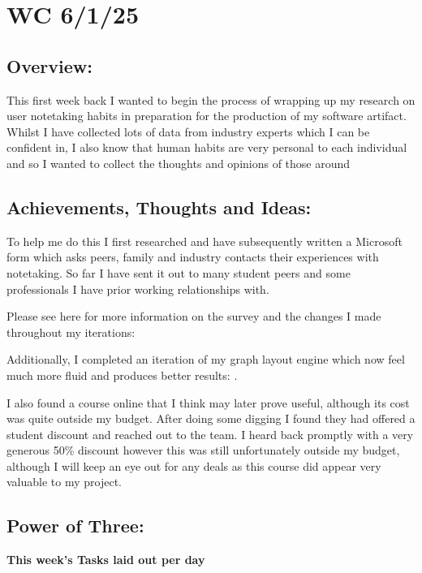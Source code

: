 \section{WC 6/1/25}

\subsection*{Overview:}
This first week back I wanted to begin the process of wrapping up my research on user notetaking habits in preparation for the production of my software artifact. Whilst I have collected lots of data from industry experts which I can be confident in, I also know that human habits are very personal to each individual and so I wanted to collect the thoughts and opinions of those around

\subsection*{Achievements, Thoughts and Ideas:}To help me do this I first researched  and have subsequently written a Microsoft form which asks peers, family and industry contacts their experiences with notetaking. So far I have sent it out to many student peers and some professionals I have prior working relationships with.

Please see here for more information on the survey and the changes I made throughout my iterations: 

Additionally, I completed an iteration of my graph layout engine which now feel much more fluid and produces better results: .

I also found a course online that I think may later prove useful, although its cost was quite outside my budget. After doing some digging I found they had offered a student discount and reached out to the team. I heard back promptly with a very generous 50\% discount however this was still unfortunately outside my budget, although I will keep an eye out for any deals as this course did appear very valuable to my project.


\subsection*{Power of Three:}
\textbf{This week's Tasks laid out per day}


